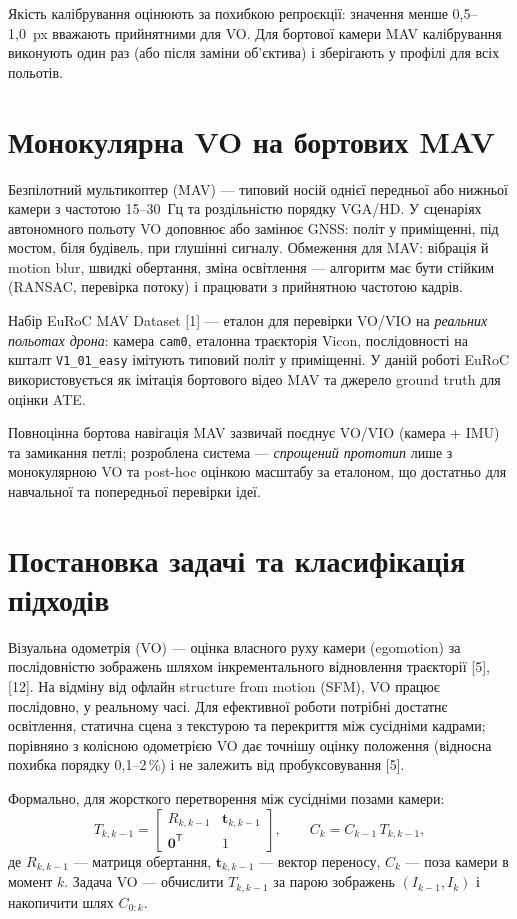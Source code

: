 \documentclass[14pt,a4paper,openany]{extreport}
\begin{document}
Якість калібрування оцінюють за похибкою репроєкції: значення менше 0{,}5--1{,}0~px вважають прийнятними для VO. Для бортової камери MAV калібрування виконують один раз (або після заміни об'єктива) і зберігають у профілі для всіх польотів.

\section{Монокулярна VO на бортових MAV}

Безпілотний мультикоптер (MAV) --- типовий носій однієї передньої або нижньої камери з частотою 15--30~Гц та роздільністю порядку VGA/HD. У сценаріях автономного польоту VO доповнює або замінює GNSS: політ у приміщенні, під мостом, біля будівель, при глушінні сигналу. Обмеження для MAV: вібрація й motion blur, швидкі обертання, зміна освітлення --- алгоритм має бути стійким (RANSAC, перевірка потоку) і працювати з прийнятною частотою кадрів.

Набір EuRoC MAV Dataset [1] --- еталон для перевірки VO/VIO на \emph{реальних польотах дрона}: камера \texttt{cam0}, еталонна траєкторія Vicon, послідовності на кшталт \texttt{V1\_01\_easy} імітують типовий політ у приміщенні. У даній роботі EuRoC використовується як імітація бортового відео MAV та джерело ground truth для оцінки ATE.

Повноцінна бортова навігація MAV зазвичай поєднує VO/VIO (камера + IMU) та замикання петлі; розроблена система --- \emph{спрощений прототип} лише з монокулярною VO та post-hoc оцінкою масштабу за еталоном, що достатньо для навчальної та попередньої перевірки ідеї.

\section{Постановка задачі та класифікація підходів}

Візуальна одометрія (VO) --- оцінка власного руху камери (egomotion) за послідовністю зображень шляхом інкрементального відновлення траєкторії [5], [12]. На відміну від офлайн structure from motion (SFM), VO працює послідовно, у реальному часі. Для ефективної роботи потрібні достатнє освітлення, статична сцена з текстурою та перекриття між сусідніми кадрами; порівняно з колісною одометрією VO дає точнішу оцінку положення (відносна похибка порядку 0,1--2\,\%) і не залежить від пробуксовування [5].

Формально, для жорсткого перетворення між сусідніми позами камери:
\begin{equation}
  T_{k,k-1} =
  \begin{bmatrix}
    R_{k,k-1} & \mathbf{t}_{k,k-1} \\
    \mathbf{0}^\mathsf{T} & 1
  \end{bmatrix},
  \qquad
  C_k = C_{k-1}\, T_{k,k-1},
  \label{eq:vo-pose}
\end{equation}
\noindent
де $R_{k,k-1}$ --- матриця обертання, $\mathbf{t}_{k,k-1}$ --- вектор переносу, $C_k$ --- поза камери в момент $k$. Задача VO --- обчислити $T_{k,k-1}$ за парою зображень $(I_{k-1}, I_k)$ і накопичити шлях $C_{0:k}$.
\end{document}
